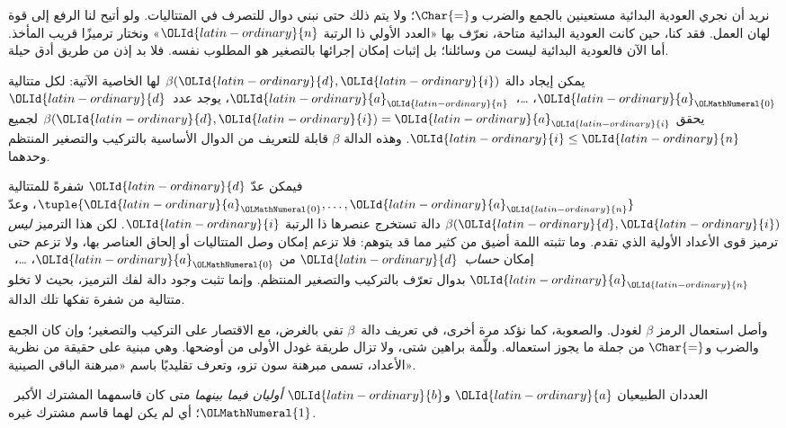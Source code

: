 \documentclass[../../../include/open-logic-section]{subfiles}
\begin{document}

نريد أن نجري العودية البدائية مستعينين بالجمع والضرب
و$\Char{=}$؛ ولا يتم ذلك حتى نبني دوال للتصرف في المتتاليات.
ولو أتيح لنا الرفع إلى قوة لهان العمل. فقد كنا، حين كانت العودية البدائية
متاحة، نعرّف بها «العدد الأولي ذا الرتبة $\OLId{latin-ordinary}{n}$» ونختار ترميزًا قريب المأخذ.
أما الآن فالعودية البدائية ليست من وسائلنا؛ بل إثبات إمكان إجرائها
بالتصغير هو المطلوب نفسه. فلا بد إذن من طريق أدق حيلة.

\begin{lem}
يمكن إيجاد دالة $\beta(\OLId{latin-ordinary}{d},\OLId{latin-ordinary}{i})$ لها الخاصية الآتية: لكل متتالية $\OLId{latin-ordinary}{a}_\OLMathNumeral{0}$، \dots،~$\OLId{latin-ordinary}{a}_\OLId{latin-ordinary}{n}$،
يوجد عدد~$\OLId{latin-ordinary}{d}$ يحقق $\beta(\OLId{latin-ordinary}{d},\OLId{latin-ordinary}{i})=\OLId{latin-ordinary}{a}_\OLId{latin-ordinary}{i}$ لجميع $\OLId{latin-ordinary}{i}\le \OLId{latin-ordinary}{n}$.
وهذه الدالة $\beta$ قابلة للتعريف من الدوال الأساسية بالتركيب والتصغير
المنتظم وحدهما.
\end{lem}

فيمكن عدّ $\OLId{latin-ordinary}{d}$ شفرةً للمتتالية $\tuple{\OLId{latin-ordinary}{a}_\OLMathNumeral{0},\dots,\OLId{latin-ordinary}{a}_\OLId{latin-ordinary}{n}}$، وعدّ
$\beta(\OLId{latin-ordinary}{d},\OLId{latin-ordinary}{i})$ دالة تستخرج عنصرها ذا الرتبة $\OLId{latin-ordinary}{i}$. لكن هذا الترميز
\emph{ليس} ترميز قوى الأعداد الأولية الذي تقدم. وما تثبته اللمة أضيق من
كثير مما قد يتوهم: فلا تزعم إمكان وصل المتتاليات أو إلحاق العناصر بها،
ولا تزعم حتى إمكان \emph{حساب}~$\OLId{latin-ordinary}{d}$ من $\OLId{latin-ordinary}{a}_\OLMathNumeral{0}$، \dots،~$\OLId{latin-ordinary}{a}_\OLId{latin-ordinary}{n}$
بدوال تعرّف بالتركيب والتصغير المنتظم. وإنما تثبت وجود دالة لفك الترميز،
بحيث لا تخلو متتالية من شفرة تفكها تلك الدالة.

وأصل استعمال الرمز $\beta$ لغودل. والصعوبة، كما نؤكد مرة أخرى، في
تعريف دالة~$\beta$ تفي بالغرض، مع الاقتصار على التركيب والتصغير؛ وإن كان
الجمع والضرب و$\Char{=}$ من جملة ما يجوز استعماله. وللّمة براهين شتى،
ولا تزال طريقة غودل الأولى من أوضحها. وهي مبنية على حقيقة من نظرية الأعداد،
تسمى مبرهنة سون تزو، وتعرف تقليديًا باسم «مبرهنة الباقي الصينية».

\begin{defn}
العددان الطبيعيان $\OLId{latin-ordinary}{a}$ و$\OLId{latin-ordinary}{b}$ \emph{أوليان فيما بينهما} متى كان
قاسمهما المشترك الأكبر~$\OLMathNumeral{1}$؛ أي لم يكن لهما قاسم مشترك غيره.
\end{defn}
\end{document}
